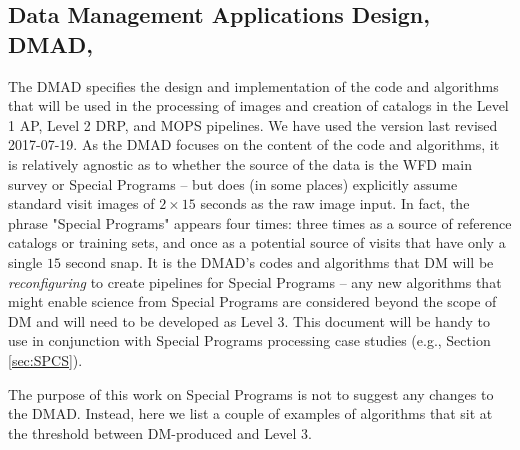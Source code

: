 


\subsection{Data Management Applications Design, DMAD, }\label{ssec:docrev_dmad}

The DMAD specifies the design and implementation of the code and algorithms that will be used in the processing of images and creation of catalogs in the Level 1 AP, Level 2 DRP, and MOPS pipelines. We have used the version last revised 2017-07-19. As the DMAD focuses on the content of the code and algorithms, it is relatively agnostic as to whether the source of the data is the WFD main survey or Special Programs -- but does (in some places) explicitly assume standard visit images of $2\times15$ seconds as the raw image input. In fact, the phrase "Special Programs" appears four times: three times as a source of reference catalogs or training sets, and once as a potential source of visits that have only a single $15$ second snap. It is the DMAD's codes and algorithms that DM will be \textit{reconfiguring} to create pipelines for Special Programs -- any new algorithms that might enable science from Special Programs are considered beyond the scope of DM and will need to be developed as Level 3. This document will be handy to use in conjunction with Special Programs processing case studies (e.g., Section \ref{sec:SPCS}).

The purpose of this work on Special Programs is not to suggest any changes to the DMAD. Instead, here we list a couple of examples of algorithms that sit at the threshold between DM-produced and Level 3.

